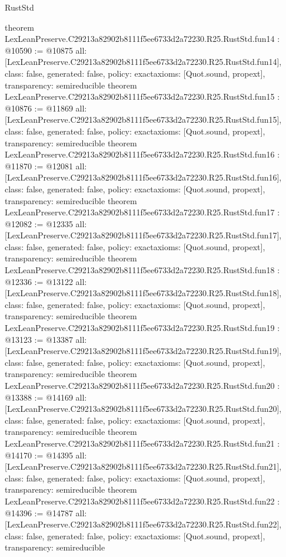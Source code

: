 \begin{lexlean}{RustStd}
\begin{coremodule}
{}
theorem LexLeanPreserve.C29213a82902b8111f5ee6733d2a72230.R25.RustStd.fun14 : @10590 := @10875 {
  all: [LexLeanPreserve.C29213a82902b8111f5ee6733d2a72230.R25.RustStd.fun14],
  class: false,
  generated: false,
  policy: exact{axioms: [Quot.sound, propext]},
  transparency: semireducible
}
theorem LexLeanPreserve.C29213a82902b8111f5ee6733d2a72230.R25.RustStd.fun15 : @10876 := @11869 {
  all: [LexLeanPreserve.C29213a82902b8111f5ee6733d2a72230.R25.RustStd.fun15],
  class: false,
  generated: false,
  policy: exact{axioms: [Quot.sound, propext]},
  transparency: semireducible
}
theorem LexLeanPreserve.C29213a82902b8111f5ee6733d2a72230.R25.RustStd.fun16 : @11870 := @12081 {
  all: [LexLeanPreserve.C29213a82902b8111f5ee6733d2a72230.R25.RustStd.fun16],
  class: false,
  generated: false,
  policy: exact{axioms: [Quot.sound, propext]},
  transparency: semireducible
}
theorem LexLeanPreserve.C29213a82902b8111f5ee6733d2a72230.R25.RustStd.fun17 : @12082 := @12335 {
  all: [LexLeanPreserve.C29213a82902b8111f5ee6733d2a72230.R25.RustStd.fun17],
  class: false,
  generated: false,
  policy: exact{axioms: [Quot.sound, propext]},
  transparency: semireducible
}
theorem LexLeanPreserve.C29213a82902b8111f5ee6733d2a72230.R25.RustStd.fun18 : @12336 := @13122 {
  all: [LexLeanPreserve.C29213a82902b8111f5ee6733d2a72230.R25.RustStd.fun18],
  class: false,
  generated: false,
  policy: exact{axioms: [Quot.sound, propext]},
  transparency: semireducible
}
theorem LexLeanPreserve.C29213a82902b8111f5ee6733d2a72230.R25.RustStd.fun19 : @13123 := @13387 {
  all: [LexLeanPreserve.C29213a82902b8111f5ee6733d2a72230.R25.RustStd.fun19],
  class: false,
  generated: false,
  policy: exact{axioms: [Quot.sound, propext]},
  transparency: semireducible
}
theorem LexLeanPreserve.C29213a82902b8111f5ee6733d2a72230.R25.RustStd.fun20 : @13388 := @14169 {
  all: [LexLeanPreserve.C29213a82902b8111f5ee6733d2a72230.R25.RustStd.fun20],
  class: false,
  generated: false,
  policy: exact{axioms: [Quot.sound, propext]},
  transparency: semireducible
}
theorem LexLeanPreserve.C29213a82902b8111f5ee6733d2a72230.R25.RustStd.fun21 : @14170 := @14395 {
  all: [LexLeanPreserve.C29213a82902b8111f5ee6733d2a72230.R25.RustStd.fun21],
  class: false,
  generated: false,
  policy: exact{axioms: [Quot.sound, propext]},
  transparency: semireducible
}
theorem LexLeanPreserve.C29213a82902b8111f5ee6733d2a72230.R25.RustStd.fun22 : @14396 := @14787 {
  all: [LexLeanPreserve.C29213a82902b8111f5ee6733d2a72230.R25.RustStd.fun22],
  class: false,
  generated: false,
  policy: exact{axioms: [Quot.sound, propext]},
  transparency: semireducible
}
\end{coremodule}
\end{lexlean}
